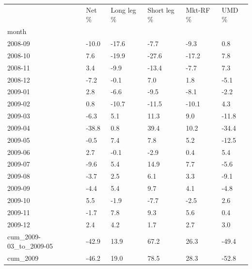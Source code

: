 \begin{tabular}{llllll}
\toprule
 & Net \% & Long leg \% & Short leg \% & Mkt-RF \% & UMD \% \\
month &  &  &  &  &  \\
\midrule
2008-09 & -10.0 & -17.6 & -7.7 & -9.3 & 0.8 \\
2008-10 & 7.6 & -19.9 & -27.6 & -17.2 & 7.8 \\
2008-11 & 3.4 & -9.9 & -13.4 & -7.7 & 7.3 \\
2008-12 & -7.2 & -0.1 & 7.0 & 1.8 & -5.1 \\
2009-01 & 2.8 & -6.6 & -9.5 & -8.1 & -2.2 \\
2009-02 & 0.8 & -10.7 & -11.5 & -10.1 & 4.3 \\
2009-03 & -6.3 & 5.1 & 11.3 & 9.0 & -11.8 \\
2009-04 & -38.8 & 0.8 & 39.4 & 10.2 & -34.4 \\
2009-05 & -0.5 & 7.4 & 7.8 & 5.2 & -12.5 \\
2009-06 & 2.7 & -0.1 & -2.9 & 0.4 & 5.4 \\
2009-07 & -9.6 & 5.4 & 14.9 & 7.7 & -5.6 \\
2009-08 & -3.7 & 2.5 & 6.1 & 3.3 & -9.1 \\
2009-09 & -4.4 & 5.4 & 9.7 & 4.1 & -4.8 \\
2009-10 & 5.5 & -1.9 & -7.7 & -2.5 & 2.6 \\
2009-11 & -1.7 & 7.8 & 9.3 & 5.6 & 0.4 \\
2009-12 & 2.4 & 4.2 & 1.7 & 2.7 & 3.0 \\
cum\_2009-03\_to\_2009-05 & -42.9 & 13.9 & 67.2 & 26.3 & -49.4 \\
cum\_2009 & -46.2 & 19.0 & 78.5 & 28.3 & -52.8 \\
\bottomrule
\end{tabular}
